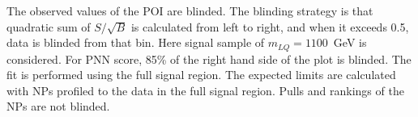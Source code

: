 The observed values of the POI are blinded. The blinding strategy is that quadratic sum of $S/\sqrt{B}$ is calculated from left to right,
and when it exceeds 0.5, data is blinded from that bin.
Here signal sample of $m_{LQ} = 1100$~GeV is considered. For PNN score, 85\% of the right hand side of the plot is blinded.
The fit is performed using the full signal region. The expected limits are calculated with NPs profiled to the data in the full signal region. 
Pulls and rankings of the NPs are not blinded. 

